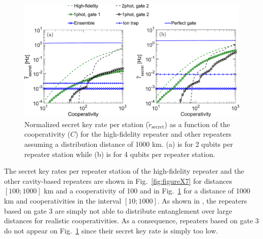 \begin{figure} [H]
\centering
\includegraphics[width=1\textwidth]{./figs_Borregaard_PRA2015/figureX8.pdf} 
\caption[Optimal secret key rate II]{Normalized secret key rate per station
($\tilde{r}_{\text{secret}}$) as a function of the cooperativity ($C$) for the
high-fidelity repeater and other repeaters assuming a distribution distance of
1000 km. (a) is for 2 qubits per repeater station while (b) is for 4 qubits per
repeater station.}
\label{fig:figureX8}
\end{figure}

The secret key rates per repeater station of the high-fidelity repeater and the
other cavity-based repeaters are shown in Fig.~\ref{fig:figureX7} for distances
$[100;1000]$ km and a cooperativity of 100 and in Fig.~\ref{fig:figureX8} for a
distance of 1000 km and cooperativities in the interval $[10;1000]$. As shown in
, the repeaters based on gate 3 are simply not able to
distribute entanglement over large distances for realistic cooperativities. As a
consequence, repeaters based on gate 3 do not appear on Fig.~\ref{fig:figureX8}
since their secret key rate is simply too low.

